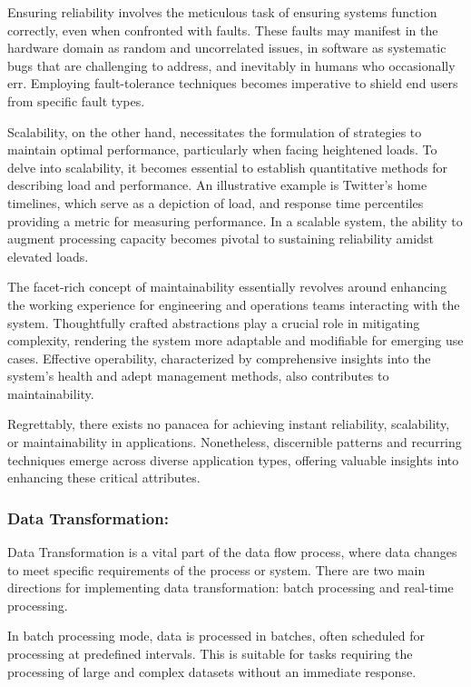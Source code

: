 Ensuring reliability involves the meticulous task of ensuring systems function
correctly, even when confronted with faults. These faults may manifest in the
hardware domain as random and uncorrelated issues, in software as systematic
bugs that are challenging to address, and inevitably in humans who occasionally
err. Employing fault-tolerance techniques becomes imperative to shield end users
from specific fault types.

Scalability, on the other hand, necessitates the formulation of strategies to
maintain optimal performance, particularly when facing heightened loads. To
delve into scalability, it becomes essential to establish quantitative methods
for describing load and performance. An illustrative example is Twitter's home
timelines, which serve as a depiction of load, and response time percentiles
providing a metric for measuring performance. In a scalable system, the ability
to augment processing capacity becomes pivotal to sustaining reliability amidst
elevated loads.

The facet-rich concept of maintainability essentially revolves around enhancing
the working experience for engineering and operations teams interacting with the
system. Thoughtfully crafted abstractions play a crucial role in mitigating
complexity, rendering the system more adaptable and modifiable for emerging use
cases. Effective operability, characterized by comprehensive insights into the
system's health and adept management methods, also contributes to
maintainability.

Regrettably, there exists no panacea for achieving instant reliability,
scalability, or maintainability in applications. Nonetheless, discernible
patterns and recurring techniques emerge across diverse application types,
offering valuable insights into enhancing these critical attributes.

\subsubsection*{Data Transformation:}

Data Transformation is a vital part of the data flow process, where data changes
to meet specific requirements of the process or system. There are two main
directions for implementing data transformation: batch processing and real-time
processing.

In batch processing mode, data is processed in batches, often scheduled for
processing at predefined intervals. This is suitable for tasks requiring the
processing of large and complex datasets without an immediate response.

